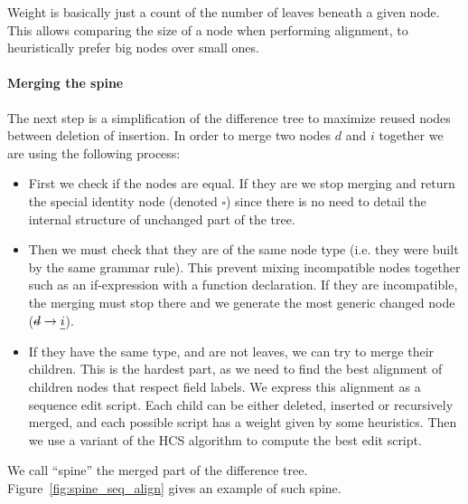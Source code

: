 \documentclass[a4paper,11pt]{article}
\newcommand\del[1]{\text{\st{$#1$}}}
\newcommand\ins[1]{\text{\ul{$#1$}}}
\newcommand\id{\square}
\newcommand\change[2]{\del{#1} \rightarrow \ins{#2}}
\begin{document}
Weight is basically just a count of the number of leaves beneath a given node.
This allows comparing the size of a node when performing alignment, to
heuristically prefer big nodes over small ones.

\paragraph{Merging the spine}
The next step is a simplification of the difference tree to maximize reused
nodes between deletion of insertion.
In order to merge two nodes $d$ and $i$ together we are using the following
process:
\begin{itemize}
 \item First we check if the nodes are equal. If they are we stop merging and
return the special identity node (denoted $\id$) since there is no need to
detail the internal structure of unchanged part of the tree.
 \item Then we must check that they are of the same node type (i.e. they were
built by the same grammar rule). This prevent
mixing incompatible nodes together such as an if-expression with a function
declaration. If they are incompatible, the merging must stop there and we
generate the most generic changed node ($\change{d}{i}$).
 \item If they have the same type, and are not leaves, we can try to merge
their children. This is the hardest part, as we need to find the best alignment
of children nodes that respect field labels. We express this alignment as a
sequence edit script. Each child can be either deleted, inserted or recursively
merged, and each possible script has a weight given by some heuristics. Then we
use a variant of the HCS algorithm to compute the best edit script.
\end{itemize}

We call ``spine'' the merged part of the difference tree.
Figure~\ref{fig:spine_seq_align} gives an example of such spine.
\end{document}
